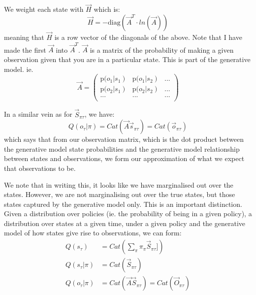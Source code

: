 \documentclass[11pt,oneside]{memoir}
\begin{document}
We weight each state with $\vec{H}$ which is:
\begin{equation}
    \vec{H}=-\text{diag}\left(\vec{A}^T \cdot ln(\vec{A})\right)
\end{equation}
meaning that $\vec{H}$ is a row vector of the diagonals of the above. Note that I have made the first $\vec{A}$ into $\vec{A}^T$. %
$\vec{A}$ is a matrix of the probability of making a given observation given that you are in a particular state. This is part of the generative model. ie.
\begin{equation}
    \vec{A}=\left(
\begin{array}{ccc}
 \text{p(}o_1\left|s_1\right) & \text{p(}o_1\left|s_2\right) & \text{...} \\
 \text{p(}o_2\left|s_1\right) & \text{p(}o_2\left|s_2\right) & \text{...} \\
 \text{...} & \text{...} & \text{...} \\
\end{array}
\right)
\end{equation}

In a similar vein as for $\vec{S}_{\pi\tau}$, we have:
$$Q(o_\tau|\pi)=Cat(\vec{A}\vec{s}_{\pi\tau})=Cat(\vec{o}_{\pi\tau})$$
which says that from our observation matrix, which is the dot product between the generative model state probabilities and the generative model relationship between states and observations, we form our approximation of what we expect that observations to be.

\begin{tcolorbox}[colback=red!5!white,colframe=black!75!black]

We note that in writing this, it looks like we have marginalised out over the states. However, we are not marginalising out over the true states, but those states captured by the generative model only. This is an important distinction. Given a distribution over policies (ie. the probability of being in a given policy), a distribution over states at a given time, under a given policy and the generative model of how states give rise to observations, we can form:
\begin{align}
    Q(s_\tau)&=Cat(\sum_\pi \pi_\pi \vec{S}_{\pi\tau}])\\
    Q(s_\tau|\pi)&=Cat(\vec{S}_{\pi\tau})\\
    Q(o_\tau|\pi)&=Cat(\vec{A}\vec{S}_{\pi\tau})=Cat(\vec{O}_{\pi\tau})\\
\end{align}
\end{tcolorbox}
\end{document}
